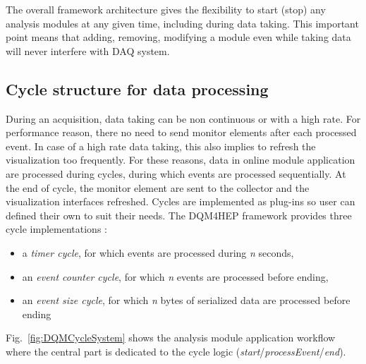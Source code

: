 \documentclass[conference]{IEEEtran}
\begin{document}
The overall framework architecture gives the flexibility to start (stop) any analysis modules at any given time, including during data taking. This important point means that adding, removing, modifying a module even while taking data will never interfere with DAQ system.

\subsection{Cycle structure for data processing}

During an acquisition, data taking can be non continuous or with a high rate. For performance reason, there no need to send monitor elements after each processed event. In case of a high rate data taking, this also implies to refresh the visualization too frequently. For these reasons, data in online module application are processed during cycles, during which events are processed sequentially. At the end of cycle, the monitor element are sent to the collector and the visualization interfaces refreshed. Cycles are implemented as plug-ins so user can defined their own to suit their needs. The DQM4HEP framework provides three cycle implementations :

\begin{itemize}
  \item a \textit{timer cycle}, for which events are processed during \textit{n} seconds,
  \item an \textit{event counter cycle}, for which \textit{n} events are processed before ending,
  \item an \textit{event size cycle}, for which \textit{n} bytes of serialized data are processed before ending
\end{itemize}

Fig.~\ref{fig:DQMCycleSystem} shows the analysis module application workflow where the central part is dedicated to the cycle logic (\textit{start}/\textit{processEvent}/\textit{end}). 
\end{document}
